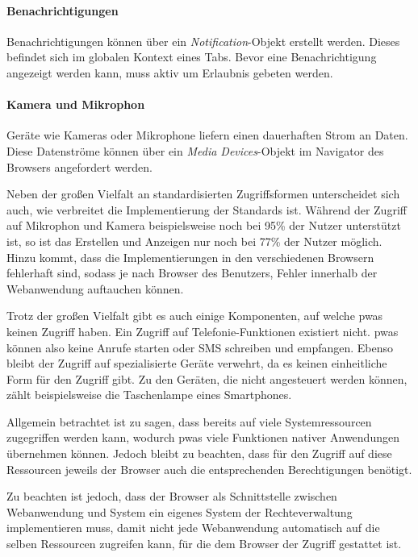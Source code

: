 \documentclass[12pt, parskip=half]{scrartcl}       %
\begin{document}
\paragraph{Benachrichtigungen} Benachrichtigungen können über ein \textit{Notification}-Objekt erstellt werden. Dieses befindet sich im globalen Kontext eines Tabs.
Bevor eine Benachrichtigung angezeigt werden kann, muss aktiv um Erlaubnis gebeten werden\cite{whatwg_notification}.

\paragraph{Kamera und Mikrophon} Geräte wie Kameras oder Mikrophone liefern einen dauerhaften Strom an Daten.
Diese Datenströme können über ein \textit{Media Devices}-Objekt im Navigator des Browsers angefordert werden\cite{w3c_mediacapture}.

Neben der großen Vielfalt an standardisierten Zugriffsformen unterscheidet sich auch, wie verbreitet die Implementierung der Standards ist.
Während der Zugriff auf Mikrophon und Kamera beispielsweise noch bei 95\% der Nutzer unterstützt ist, so ist das Erstellen und Anzeigen nur noch bei 77\% der Nutzer möglich\cite{caniuse}.
Hinzu kommt, dass die Implementierungen in den verschiedenen Browsern fehlerhaft sind, sodass je nach Browser des Benutzers, Fehler innerhalb der Webanwendung auftauchen können.

Trotz der großen Vielfalt gibt es auch einige Komponenten, auf welche \acp{pwa} keinen Zugriff haben.
Ein Zugriff auf Telefonie-Funktionen existiert nicht.
\acp{pwa} können also keine Anrufe starten oder SMS schreiben und empfangen.
Ebenso bleibt der Zugriff auf spezialisierte Geräte verwehrt, da es keinen einheitliche Form für den Zugriff gibt.
Zu den Geräten, die nicht angesteuert werden können, zählt beispielsweise die Taschenlampe eines Smartphones.

Allgemein betrachtet ist zu sagen, dass bereits auf viele Systemressourcen zugegriffen werden kann, wodurch \acp{pwa} viele Funktionen nativer Anwendungen übernehmen können.
Jedoch bleibt zu beachten, dass für den Zugriff auf diese Ressourcen jeweils der Browser auch die entsprechenden Berechtigungen benötigt.

Zu beachten ist jedoch, dass der Browser als Schnittstelle zwischen Webanwendung und System ein eigenes System der Rechteverwaltung implementieren muss, damit nicht jede Webanwendung automatisch auf die selben Ressourcen zugreifen kann, für die dem Browser der Zugriff gestattet ist.
\end{document}
